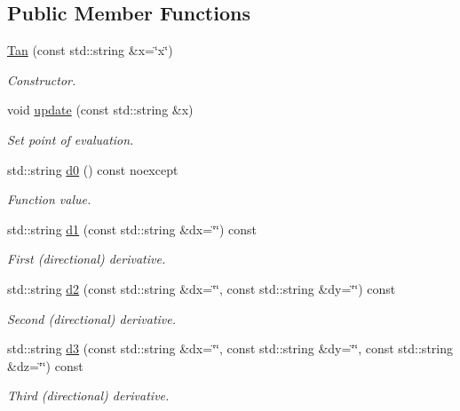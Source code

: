 \subsection*{Public Member Functions}
\begin{DoxyCompactItemize}
\item 
\hyperlink{structFunG_1_1stringify_1_1Tan_ab529003b061d3c90e3fc9fd484c831cf}{Tan} (const std\-::string \&x=\char`\"{}x\char`\"{})
\begin{DoxyCompactList}\small\item\em Constructor. \end{DoxyCompactList}\item 
void \hyperlink{structFunG_1_1stringify_1_1Tan_a84d05396905a1d43c8709ead0b1fb1cf}{update} (const std\-::string \&x)
\begin{DoxyCompactList}\small\item\em Set point of evaluation. \end{DoxyCompactList}\item 
std\-::string \hyperlink{structFunG_1_1stringify_1_1Tan_ade1318f328b60a3e70ad0a6302b7a1f2}{d0} () const noexcept
\begin{DoxyCompactList}\small\item\em Function value. \end{DoxyCompactList}\item 
std\-::string \hyperlink{structFunG_1_1stringify_1_1Tan_a244c8c7d40ce87dd16a2884fe483ad08}{d1} (const std\-::string \&dx=\char`\"{}\char`\"{}) const 
\begin{DoxyCompactList}\small\item\em First (directional) derivative. \end{DoxyCompactList}\item 
std\-::string \hyperlink{structFunG_1_1stringify_1_1Tan_a874c5fbbb34349e1be88e62a3013e979}{d2} (const std\-::string \&dx=\char`\"{}\char`\"{}, const std\-::string \&dy=\char`\"{}\char`\"{}) const 
\begin{DoxyCompactList}\small\item\em Second (directional) derivative. \end{DoxyCompactList}\item 
std\-::string \hyperlink{structFunG_1_1stringify_1_1Tan_a462117ba8a073c14d2529d3c5782cc3f}{d3} (const std\-::string \&dx=\char`\"{}\char`\"{}, const std\-::string \&dy=\char`\"{}\char`\"{}, const std\-::string \&dz=\char`\"{}\char`\"{}) const 
\begin{DoxyCompactList}\small\item\em Third (directional) derivative. \end{DoxyCompactList}\end{DoxyCompactItemize}


